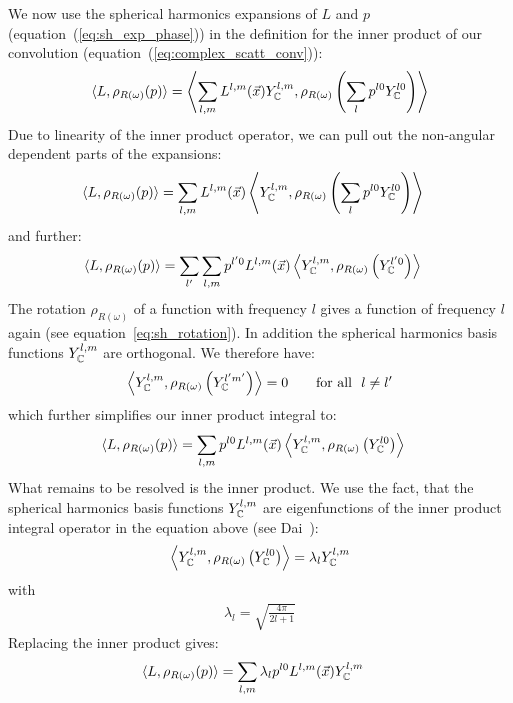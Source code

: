 We now use the spherical harmonics expansions of $L$ and $p$ (equation~(\ref{eq:sh_exp_phase})) in the definition for the inner product of our convolution (equation~(\ref{eq:complex_scatt_conv})):
\begin{align*}
\langle L,  \rho_{R(\omega)}(p)\rangle = \left < \sum_{l,m}{L^{l,m}(\vec{x}) Y_{\mathbb{C}}^{l,m}}, \rho_{R(\omega)}\left ( \sum_{l}{p^{l0}Y_{\mathbb{C}}^{l0}} \right )\right>
\end{align*}
Due to linearity of the inner product operator, we can pull out the non-angular dependent parts of the expansions:
\begin{align*}
\langle L,  \rho_{R(\omega)}(p)\rangle
&=
\sum_{l,m}
{
L^{l,m}(\vec{x})
\left<
Y_{\mathbb{C}}^{l,m},
\rho_{R(\omega)}
\left(\sum_l{p^{l0} Y_{\mathbb{C}}^{l0}}\right)
\right>
}
\end{align*}
and further:
\begin{align*}
\langle L,  \rho_{R(\omega)}(p)\rangle
&=
\sum_{l'}
{
\sum_{l,m}
{
p^{l'0}L^{l,m}(\vec{x})
\left<Y_{\mathbb{C}}^{l,m}, \rho_{R(\omega)}\left( Y_{\mathbb{C}}^{l'0} \right)\right>
}
}
\end{align*}
The rotation $\rho_{R(\omega)}$ of a function with frequency $l$ gives a function of frequency $l$ again (see equation~\ref{eq:sh_rotation}). In addition the spherical harmonics basis functions $Y_{\mathbb{C}}^{l,m}$ are orthogonal. We therefore have:
\begin{align*}
\left<
Y_{\mathbb{C}}^{l,m}, \rho_{R(\omega)}\left(Y_{\mathbb{C}}^{l'm'}\right)
\right> = 0       \qquad    \text{for all}\ \ l\ne l' 
\end{align*}
which further simplifies our inner product integral to:
\begin{align*}
\langle L,  \rho_{R(\omega)}(p)\rangle
&=
\sum_{l,m}
{
p^{l0}L^{l,m}(\vec{x})
\left<
Y_{\mathbb{C}}^{l,m}, \rho_{R(\omega)}\left(Y_{\mathbb{C}}^{l0} \right )
\right>
}
\end{align*}
What remains to be resolved is the inner product. We use the fact, that the spherical harmonics basis functions $ Y_{\mathbb{C}}^{l,m}$ are eigenfunctions of the inner product integral operator in the equation above (see Dai~\cite{Dai13}):
\begin{align*}
\left<
Y_{\mathbb{C}}^{l,m}, \rho_{R(\omega)}\left ( Y_{\mathbb{C}}^{l0} \right )\right> = \lambda_l Y_{\mathbb{C}}^{l,m}
\end{align*}
with
\begin{align*}
\lambda_l=\sqrt{\frac{4\pi}{2l+1}}
\end{align*}
Replacing the inner product gives:
\begin{align*}
\langle L,  \rho_{R(\omega)}(p)\rangle
&=
\sum_{l,m}
{
\lambda_l
p^{l0}L^{l,m}(\vec{x})
Y_{\mathbb{C}}^{l,m}
}
\end{align*}
